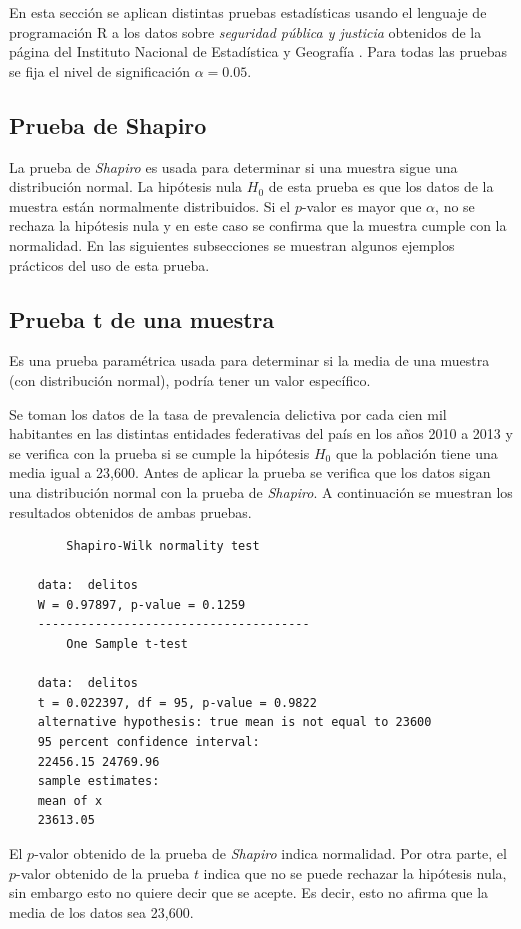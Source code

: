 \documentclass[12pt]{article}
\begin{document}
	En esta sección se aplican distintas pruebas estadísticas usando el lenguaje de programación \textsc{R} \cite{rstatistics} a los datos sobre {\em seguridad pública y justicia} obtenidos de la página del Instituto Nacional de Estadística y Geografía \cite{inegi}. Para todas las pruebas se fija el nivel de significación $\alpha = 0.05$.
	
	\subsection{Prueba de Shapiro}
	
	La prueba de {\em Shapiro} es usada para determinar si una muestra sigue una distribución normal. La hipótesis nula $H_0$ de esta prueba es que los datos de la muestra están normalmente distribuidos. Si el $p$-valor es mayor que $\alpha$, no se rechaza la hipótesis nula y en este caso se confirma que la muestra cumple con la normalidad. En las siguientes subsecciones se muestran algunos ejemplos prácticos del uso de esta prueba.
	
	\subsection{Prueba t de una muestra}
	
	Es una prueba paramétrica usada para determinar si la media de una muestra (con distribución normal), podría tener un valor específico.
	
	Se toman los datos de la tasa de prevalencia delictiva por cada cien mil habitantes en las distintas entidades federativas del país en los años 2010 a 2013 y se verifica con la prueba si se cumple la hipótesis $H_0$ que la población tiene una media igual a 23,600. Antes de aplicar la prueba se verifica que los datos sigan una distribución normal con la prueba de {\em Shapiro}. A continuación se muestran los resultados obtenidos de ambas pruebas.
	\begin{verbatim}
		Shapiro-Wilk normality test
	
	data:  delitos
	W = 0.97897, p-value = 0.1259
	--------------------------------------
		One Sample t-test
	
	data:  delitos
	t = 0.022397, df = 95, p-value = 0.9822
	alternative hypothesis: true mean is not equal to 23600
	95 percent confidence interval:
	22456.15 24769.96
	sample estimates:
	mean of x 
	23613.05 
	\end{verbatim}

	El $p$-valor obtenido de la prueba de {\em Shapiro} indica normalidad. Por otra parte, el $p$-valor obtenido de la prueba $t$ indica que no se puede rechazar la hipótesis nula, sin embargo esto no quiere decir que se acepte. Es decir, esto no afirma que la media de los datos sea 23,600. 
	
\end{document}
